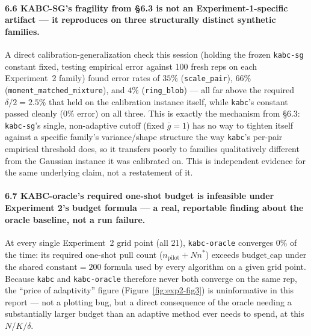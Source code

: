 \documentclass[11pt]{article}
\begin{document}
\paragraph{6.6 KABC-SG's fragility from \S6.3 is not an Experiment-1-specific
artifact --- it reproduces on three structurally distinct synthetic families.}
A direct calibration-generalization check this session (holding the frozen
\texttt{kabc-sg} constant fixed, testing empirical error against 100 fresh
reps on each Experiment~2 family) found error rates of $35\%$
(\texttt{scale\_pair}), $66\%$ (\texttt{moment\_matched\_mixture}), and $4\%$
(\texttt{ring\_blob}) --- all far above the required $\delta/2=2.5\%$ that
held on the calibration instance itself, while \texttt{kabc}'s constant
passed cleanly ($0\%$ error) on all three. This is exactly the mechanism from
\S6.3: \texttt{kabc-sg}'s single, non-adaptive cutoff (fixed $\bar g=1$) has
no way to tighten itself against a specific family's variance/shape
structure the way \texttt{kabc}'s per-pair empirical threshold does, so it
transfers poorly to families qualitatively different from the Gaussian
instance it was calibrated on. This is independent evidence for the same
underlying claim, not a restatement of it.

\paragraph{6.7 KABC-oracle's required one-shot budget is infeasible under
Experiment 2's budget formula --- a real, reportable finding about the
oracle baseline, not a run failure.} At every single Experiment~2 grid point
(all 21), \texttt{kabc-oracle} converges $0\%$ of the time: its required
one-shot pull count ($n_{\text{pilot}} + N n^*$) exceeds
$\text{budget\_cap}$ under the shared $\text{constant}=200$ formula used by
every algorithm on a given grid point. Because \texttt{kabc} and
\texttt{kabc-oracle} therefore never both converge on the same rep, the
``price of adaptivity'' figure (Figure~\ref{fig:exp2-fig3}) is uninformative
in this report --- not a plotting bug, but a direct consequence of the
oracle needing a substantially larger budget than an adaptive method ever
needs to spend, at this $N/K/\delta$.
\end{document}
